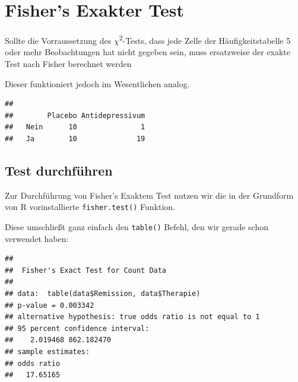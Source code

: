 \documentclass[
]{book}
\newenvironment{Shaded}{\begin{snugshade}}{\end{snugshade}}
\newcommand{\FunctionTok}[1]{\textcolor[rgb]{0.00,0.00,0.00}{#1}}
\newcommand{\NormalTok}[1]{#1}
\newcommand{\SpecialCharTok}[1]{\textcolor[rgb]{0.00,0.00,0.00}{#1}}
\begin{document}
\hypertarget{fishers-exakter-test}{%
\section{Fisher's Exakter Test}\label{fishers-exakter-test}}

Sollte die Vorraussetzung des \(\chi\)\textsuperscript{2}-Tests, dass jede Zelle der Häufigkeitstabelle 5 oder mehr Beobachtungen hat nicht gegeben sein, muss ersatzweise der exakte Test nach Fisher berechnet werden

Dieser funktioniert jedoch im Wesentlichen analog.

\begin{Shaded}
\end{Shaded}

\begin{verbatim}
##       
##        Placebo Antidepressivum
##   Nein      10               1
##   Ja        10              19
\end{verbatim}

\hypertarget{test-durchfuxfchren-6}{%
\subsection{Test durchführen}\label{test-durchfuxfchren-6}}

Zur Durchführung von Fisher's Exaktem Test nutzen wir die in der Grundform von R vorinstallierte \texttt{fisher.test()} Funktion.

Diese umschließt ganz einfach den \texttt{table()} Befehl, den wir gerade schon verwendet haben:

\begin{Shaded}
\end{Shaded}

\begin{verbatim}
## 
##  Fisher's Exact Test for Count Data
## 
## data:  table(data$Remission, data$Therapie)
## p-value = 0.003342
## alternative hypothesis: true odds ratio is not equal to 1
## 95 percent confidence interval:
##    2.019468 862.182470
## sample estimates:
## odds ratio 
##   17.65165
\end{verbatim}
\end{document}
